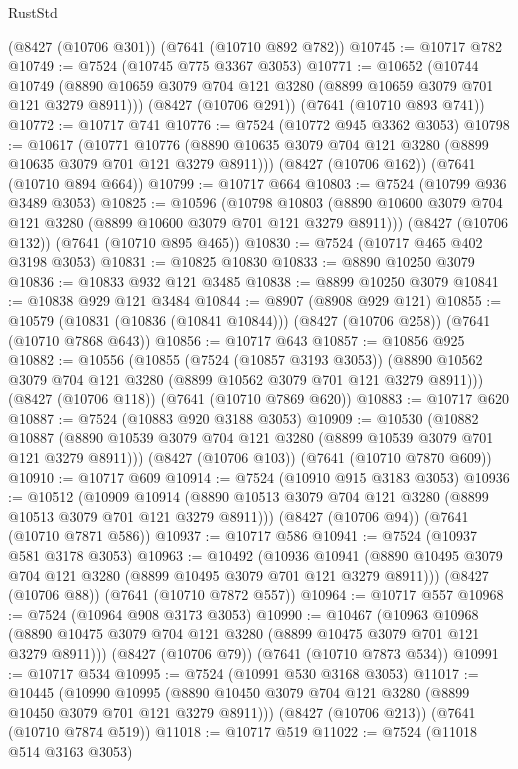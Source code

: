 \begin{lexlean}{RustStd}
\begin{coremodule}
{\begin{coremodule}
{{{{{{{{{{{{{{{{{{{{{{{{{{{{{{{{    (@8427 (@10706 @301))
    (@7641 (@10710 @892 @782))
@10745 := @10717 @782
@10749 := @7524 (@10745 @775 @3367 @3053)
@10771 := @10652
    (@10744 @10749 (@8890 @10659 @3079 @704 @121 @3280 (@8899 @10659 @3079 @701 @121 @3279 @8911)))
    (@8427 (@10706 @291))
    (@7641 (@10710 @893 @741))
@10772 := @10717 @741
@10776 := @7524 (@10772 @945 @3362 @3053)
@10798 := @10617
    (@10771 @10776 (@8890 @10635 @3079 @704 @121 @3280 (@8899 @10635 @3079 @701 @121 @3279 @8911)))
    (@8427 (@10706 @162))
    (@7641 (@10710 @894 @664))
@10799 := @10717 @664
@10803 := @7524 (@10799 @936 @3489 @3053)
@10825 := @10596
    (@10798 @10803 (@8890 @10600 @3079 @704 @121 @3280 (@8899 @10600 @3079 @701 @121 @3279 @8911)))
    (@8427 (@10706 @132))
    (@7641 (@10710 @895 @465))
@10830 := @7524 (@10717 @465 @402 @3198 @3053)
@10831 := @10825 @10830
@10833 := @8890 @10250 @3079
@10836 := @10833 @932 @121 @3485
@10838 := @8899 @10250 @3079
@10841 := @10838 @929 @121 @3484
@10844 := @8907 (@8908 @929 @121)
@10855 := @10579 (@10831 (@10836 (@10841 @10844))) (@8427 (@10706 @258)) (@7641 (@10710 @7868 @643))
@10856 := @10717 @643
@10857 := @10856 @925
@10882 := @10556
    (@10855
      (@7524 (@10857 @3193 @3053))
      (@8890 @10562 @3079 @704 @121 @3280 (@8899 @10562 @3079 @701 @121 @3279 @8911)))
    (@8427 (@10706 @118))
    (@7641 (@10710 @7869 @620))
@10883 := @10717 @620
@10887 := @7524 (@10883 @920 @3188 @3053)
@10909 := @10530
    (@10882 @10887 (@8890 @10539 @3079 @704 @121 @3280 (@8899 @10539 @3079 @701 @121 @3279 @8911)))
    (@8427 (@10706 @103))
    (@7641 (@10710 @7870 @609))
@10910 := @10717 @609
@10914 := @7524 (@10910 @915 @3183 @3053)
@10936 := @10512
    (@10909 @10914 (@8890 @10513 @3079 @704 @121 @3280 (@8899 @10513 @3079 @701 @121 @3279 @8911)))
    (@8427 (@10706 @94))
    (@7641 (@10710 @7871 @586))
@10937 := @10717 @586
@10941 := @7524 (@10937 @581 @3178 @3053)
@10963 := @10492
    (@10936 @10941 (@8890 @10495 @3079 @704 @121 @3280 (@8899 @10495 @3079 @701 @121 @3279 @8911)))
    (@8427 (@10706 @88))
    (@7641 (@10710 @7872 @557))
@10964 := @10717 @557
@10968 := @7524 (@10964 @908 @3173 @3053)
@10990 := @10467
    (@10963 @10968 (@8890 @10475 @3079 @704 @121 @3280 (@8899 @10475 @3079 @701 @121 @3279 @8911)))
    (@8427 (@10706 @79))
    (@7641 (@10710 @7873 @534))
@10991 := @10717 @534
@10995 := @7524 (@10991 @530 @3168 @3053)
@11017 := @10445
    (@10990 @10995 (@8890 @10450 @3079 @704 @121 @3280 (@8899 @10450 @3079 @701 @121 @3279 @8911)))
    (@8427 (@10706 @213))
    (@7641 (@10710 @7874 @519))
@11018 := @10717 @519
@11022 := @7524 (@11018 @514 @3163 @3053)
}}}}}}}}}}}}}}}}}}}}}}}}}}}}}}}}
\end{coremodule}}
\end{coremodule}
\end{lexlean}
